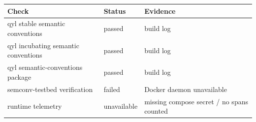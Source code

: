 \begin{tabular}{lll}
\hline
Check & Status & Evidence \\
\hline
qyl stable semantic conventions & passed & build log \\
qyl incubating semantic conventions & passed & build log \\
qyl semantic-conventions package & passed & build log \\
semconv-testbed verification & failed & Docker daemon unavailable \\
runtime telemetry & unavailable & missing compose secret / no spans counted \\
\hline
\end{tabular}

